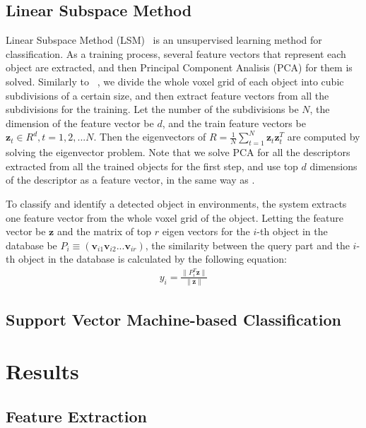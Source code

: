 \documentclass[conference]{sty/IEEEtran}
\begin{document}
\subsection{Linear Subspace Method}
\label{sec:subspace}
Linear Subspace Method (LSM)~\cite{watanabe1973} is an unsupervised learning method for classification. 
As a training process, several feature vectors that represent each object are extracted, 
and then Principal Component Analisis (PCA) for them is solved. 
Similarly to ~\cite{kanezaki2010icra}, we divide the whole voxel grid of each object into 
cubic subdivisions of a certain size, and then extract feature vectors from all the subdivisions for the training. 
Let the number of the subdivisions be $N$, the dimension of the feature vector be $d$, 
and the train feature vectors be $\bm{z}_t \in R^d, t=1,2,...N$. 
Then the eigenvectors of $R=\frac{1}{N} \sum^{N}_{t=1} \bm{z}_t \bm{z}_t^T$ are computed by solving the eigenvector problem. 
Note that we solve PCA for all the descriptors extracted from all the trained objects for the first step, 
and use top $d$ dimensions of the descriptor as a feature vector, in the same way as \cite{kanezaki2010icra}.

To classify and identify a detected object in environments, the system extracts one feature vector from the whole voxel grid of the object. 
Letting the feature vector be $\bm{z}$ and the matrix of top $r$ eigen vectors for the $i$-th object in the database be $P_i \equiv (\bm{v}_{i1} \bm{v}_{i2} ... \bm{v}_{ir})$,
the similarity between the query part and the $i$-th object in the database is calculated by the following equation:
\begin{eqnarray}\label{eq:y_calc}
  y_i = \frac{\| P_i^T \bm{z} \|}{\| \bm{z} \|}
\end{eqnarray}



\subsection{Support Vector Machine-based Classification}

\section{Results}
\label{sec:results}

\subsection{Feature Extraction}
\end{document}
